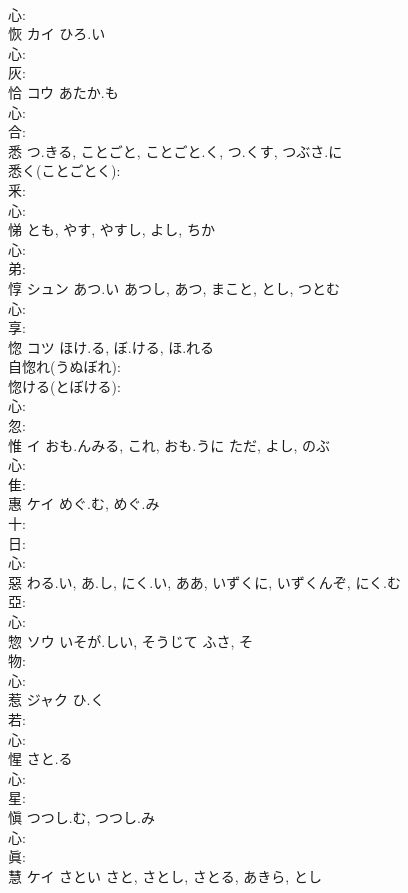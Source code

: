\documentclass[8pt]{extreport}
\begin{document}
\begin{CJK}{UTF8}{min}
\\	心: 
\\	恢	カイ	ひろ.い		
\\	心: 
\\	灰: 
\\	恰	コウ	あたか.も		
\\	心: 
\\	合: 
\\	悉		つ.きる, ことごと, ことごと.く, つ.くす, つぶさ.に			
\\	悉く(ことごとく): 
\\	釆: 
\\	心: 
\\	悌			とも, やす, やすし, よし, ちか		
\\	心: 
\\	弟: 
\\	惇	シュン	あつ.い	あつし, あつ, まこと, とし, つとむ	
\\	心: 
\\	享: 
\\	惚	コツ	ほけ.る, ぼ.ける, ほ.れる		
\\	自惚れ(うぬぼれ): 
\\	惚ける(とぼける): 
\\	心: 
\\	忽: 
\\	惟	イ	おも.んみる, これ, おも.うに	ただ, よし, のぶ	
\\	心: 
\\	隹: 
\\	惠	ケイ	めぐ.む, めぐ.み		
\\	十: 
\\	日: 
\\	心: 
\\	惡		わる.い, あ.し, にく.い, ああ, いずくに, いずくんぞ, にく.む				
\\	亞: 
\\	心: 
\\	惣	ソウ	いそが.しい, そうじて	ふさ, そ	
\\	物: 
\\	心: 
\\	惹	ジャク	ひ.く		
\\	若: 
\\	心: 
\\	惺		さと.る				
\\	心: 
\\	星: 
\\	愼		つつし.む, つつし.み				
\\	心: 
\\	眞: 
\\	慧	ケイ	さとい	さと, さとし, さとる, あきら, とし	

\end{CJK}
\end{document}
